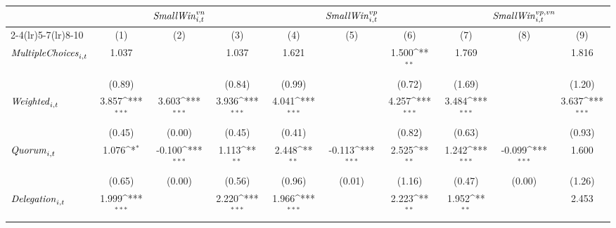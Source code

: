 {
\def\sym#1{\ifmmode^{#1}\else\(^{#1}\)\fi}
\begin{tabular}{l*{9}{c}}
\toprule
                    &\multicolumn{3}{c}{${\it Small Win}^{vn}_{i,t}$}                 &\multicolumn{3}{c}{${\it Small Win}^{vp}_{i,t}$}                 &\multicolumn{3}{c}{${\it Small Win}^{vp,vn}_{i,t}$}              \\\cmidrule(lr){2-4}\cmidrule(lr){5-7}\cmidrule(lr){8-10}
                    &\multicolumn{1}{c}{(1)}         &\multicolumn{1}{c}{(2)}         &\multicolumn{1}{c}{(3)}         &\multicolumn{1}{c}{(4)}         &\multicolumn{1}{c}{(5)}         &\multicolumn{1}{c}{(6)}         &\multicolumn{1}{c}{(7)}         &\multicolumn{1}{c}{(8)}         &\multicolumn{1}{c}{(9)}         \\
\midrule
${\it Multiple Choices}_{i,t}$&       1.037         &                     &       1.037         &       1.621         &                     &       1.500\sym{**} &       1.769         &                     &       1.816         \\
                    &      (0.89)         &                     &      (0.84)         &      (0.99)         &                     &      (0.72)         &      (1.69)         &                     &      (1.20)         \\
${\it Weighted}_{i,t}$&       3.857\sym{***}&       3.603\sym{***}&       3.936\sym{***}&       4.041\sym{***}&                     &       4.257\sym{***}&       3.484\sym{***}&                     &       3.637\sym{***}\\
                    &      (0.45)         &      (0.00)         &      (0.45)         &      (0.41)         &                     &      (0.82)         &      (0.63)         &                     &      (0.93)         \\
${\it Quorum}_{i,t}$&       1.076\sym{*}  &      -0.100\sym{***}&       1.113\sym{**} &       2.448\sym{**} &      -0.113\sym{***}&       2.525\sym{**} &       1.242\sym{***}&      -0.099\sym{***}&       1.600         \\
                    &      (0.65)         &      (0.00)         &      (0.56)         &      (0.96)         &      (0.01)         &      (1.16)         &      (0.47)         &      (0.00)         &      (1.26)         \\
${\it Delegation}_{i,t}$&       1.999\sym{***}&                     &       2.220\sym{***}&       1.966\sym{***}&                     &       2.223\sym{**} &       1.952\sym{**} &                     &       2.453         \\

\end{tabular}}
